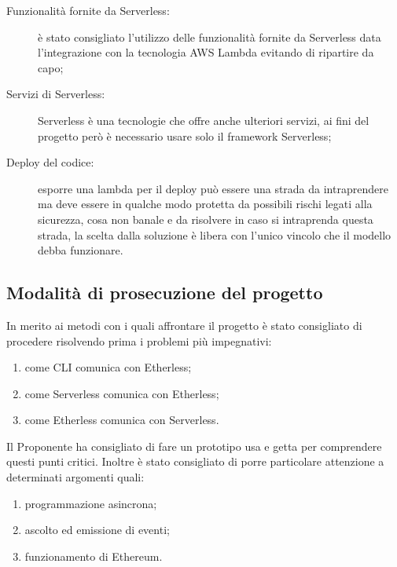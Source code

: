 \begin{description}
	\item[Funzionalità fornite da Serverless:] è stato consigliato l'utilizzo delle funzionalità fornite da Serverless data l'integrazione con la tecnologia AWS Lambda evitando di ripartire da capo;
	\item[Servizi di Serverless:] Serverless è una tecnologie che offre anche ulteriori servizi, ai fini del progetto però è necessario usare solo il framework Serverless;
	\item[Deploy del codice:] esporre una lambda per il deploy può essere una strada da intraprendere ma deve essere in qualche modo protetta da possibili rischi legati alla sicurezza, cosa non banale e da risolvere in caso si intraprenda questa strada, la scelta dalla soluzione è libera con l'unico vincolo che il modello debba funzionare.
\end{description}

\subsection{Modalità di prosecuzione del progetto}
In merito ai metodi con i quali affrontare il progetto è stato consigliato di procedere risolvendo prima i problemi più impegnativi:
	\begin{enumerate}
		\item come CLI comunica con Etherless;
		\item come Serverless comunica con Etherless;
		\item come Etherless comunica con Serverless.
	\end{enumerate}
	Il  Proponente ha consigliato di fare un prototipo usa e getta per comprendere questi punti critici.
	Inoltre è stato consigliato di porre particolare attenzione a determinati argomenti quali:
	\begin{enumerate}
		\item programmazione asincrona;
		\item ascolto ed emissione di eventi;
		\item funzionamento di Ethereum.
	\end{enumerate}
